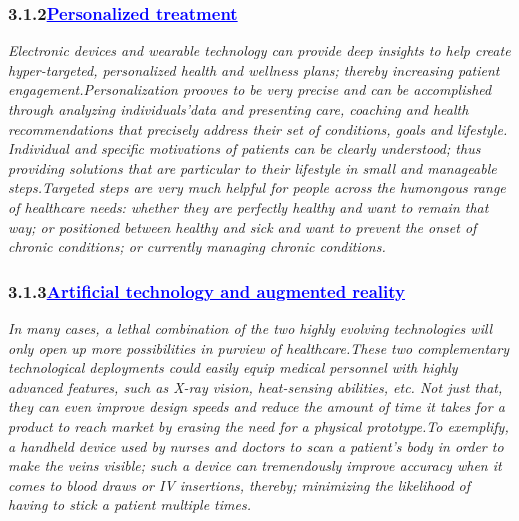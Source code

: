 \documentclass[12pt]{article}
\begin{document}
\subsubsection*{\textbf{\hspace{2cm}3.1.2\hspace{1cm}\textcolor{blue}{\underline{\Large{Personalized treatment}}}}}
\hspace{3cm}\large{\emph{Electronic devices and wearable technology can provide deep insights to help create hyper-targeted, personalized health and wellness plans; thereby increasing patient engagement.\newline Personalization prooves to be very precise and can be accomplished through analyzing individuals’data and presenting care, coaching and health recommendations that precisely address their set of conditions, goals and lifestyle. Individual and specific motivations of patients can be clearly understood; thus providing solutions that are particular to their lifestyle in small and manageable steps.\newline Targeted steps are very much helpful for people across the humongous range of healthcare needs: whether they are perfectly healthy and want to remain that way; or positioned between healthy and sick and want to prevent the onset of chronic conditions; or currently managing chronic conditions.}}\newpage
\subsubsection*{\textbf{\hspace{2cm}3.1.3\hspace{1cm}\textcolor{blue}{\underline{\Large{Artificial technology and augmented reality}}}}}
\hspace{3cm}\large{\emph{In many cases, a lethal combination of the two highly evolving technologies will only open up more possibilities in purview of healthcare.These two complementary technological deployments could easily equip medical personnel with highly advanced features, such as X-ray vision, heat-sensing abilities, etc. Not just that, they can even improve design speeds and reduce the amount of time it takes for a product to reach market by erasing the need for a physical prototype.\newline To exemplify, a handheld device used by nurses and doctors to scan a patient’s body in order to make the veins visible; such a device can tremendously improve accuracy when it comes to blood draws or IV insertions, thereby;  minimizing the likelihood of having to stick a patient multiple times.}}
\end{document}
